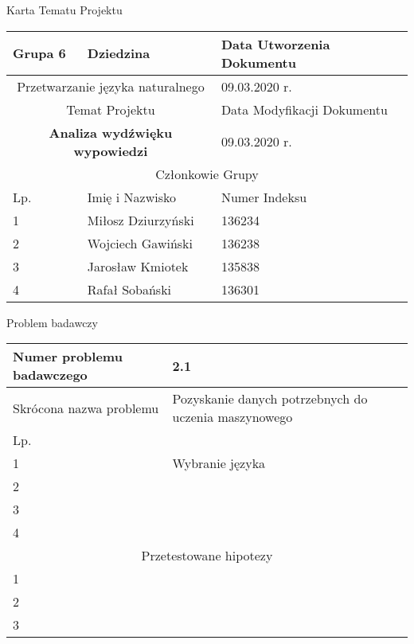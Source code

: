 \documentclass[11pt,a4paper]{article}
\begin{document}
\begin{center}
    \Large
    Karta Tematu Projektu
\end{center}
\begin{center}
\begin{table}[h]
    \centering
    \begin{tabular}{|p{3cm}|p{5cm}|p{5cm}|}
         \hline
         Grupa 6 & Dziedzina & Data Utworzenia Dokumentu \\ \hline
        \multicolumn{2}{|c|}{Przetwarzanie języka naturalnego} & 09.03.2020 r. \\ \hline
         \multicolumn{2}{|c|}{Temat Projektu} & Data Modyfikacji Dokumentu \\ \hline
         \multicolumn{2}{|c|}{\textbf{Analiza wydźwięku wypowiedzi}} & 09.03.2020 r. \\ \hline
         \multicolumn{3}{|c|}{Członkowie Grupy} \\ \hline
         Lp. & Imię i Nazwisko & Numer Indeksu \\ \hline     
         1 & Miłosz Dziurzyński & 136234 \\ \hline
         2 & Wojciech Gawiński & 136238 \\ \hline
         3 & Jarosław Kmiotek & 135838 \\ \hline
         4 & Rafał Sobański & 136301 \\ \hline
    \end{tabular}
    \label{tab:my_label}
\end{table}
\end{center}

\begin{center}
    \large
    Problem badawczy
\end{center}
\begin{table}[h]
    \centering
    \begin{tabular}{|p{4.5cm}|p{9cm}|}
        \hline
         Numer problemu badawczego & 2.1 \\
         \hline
         Skrócona nazwa problemu & Pozyskanie danych potrzebnych do uczenia maszynowego\\
         \hline
         Lp. &  \\ \hline
         1 &   Wybranie języka  \\ \hline
         2 &  \\ \hline
         3 &   \\ \hline
         4 &   \\ \hline
         \multicolumn{2}{|c|}{Przetestowane hipotezy} \\ \hline
         1 &  \\ \hline
         2 &  \\ \hline
         3 &   \\ \hline
    \end{tabular}
    \label{tab:my_label}
\end{table}
\end{document}
